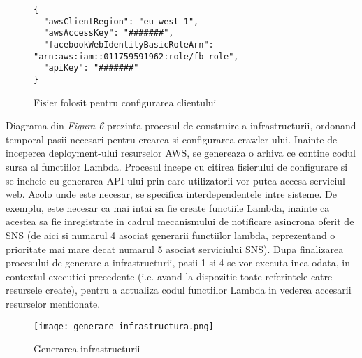 \begin{figure}[ht]
\begin{verbatim}
{
  "awsClientRegion": "eu-west-1",
  "awsAccessKey": "#######",
  "facebookWebIdentityBasicRoleArn": "arn:aws:iam::011759591962:role/fb-role",
  "apiKey": "#######"
}
\end{verbatim}
\begin{center}
	\caption{Fisier folosit pentru configurarea clientului}\par\medskip
	
\end{center}
\end{figure}

Diagrama din \textit{Figura 6} prezinta procesul de construire a infrastructurii, ordonand temporal pasii necesari pentru crearea si configurarea crawler-ului. Inainte de inceperea deployment-ului resurselor AWS, se genereaza o arhiva ce contine codul sursa al functiilor Lambda. Procesul incepe cu citirea fisierului de configurare si se incheie cu generarea API-ului prin care utilizatorii vor putea accesa serviciul web. Acolo unde este necesar, se specifica interdependentele intre sisteme. De exemplu, este necesar ca mai intai sa fie create functiile Lambda, inainte ca acestea sa fie inregistrate in cadrul mecanismului de notificare asincrona oferit de SNS (de aici si numarul 4 asociat generarii functiilor lambda, reprezentand o prioritate mai mare decat numarul 5 asociat serviciului SNS). Dupa finalizarea procesului de generare a infrastructurii, pasii 1 si 4 se vor executa inca odata, in contextul executiei precedente (i.e. avand la dispozitie toate referintele catre resursele create), pentru a actualiza codul functiilor Lambda in vederea accesarii resurselor mentionate.

\begin{figure}[ht]
\begin{center}
	\texttt{[image: generare-infrastructura.png]}
	\caption{Generarea infrastructurii \cite{diagram-icons-sources, aws-icons-source}}\par\medskip 

\end{center}
\end{figure}

 
